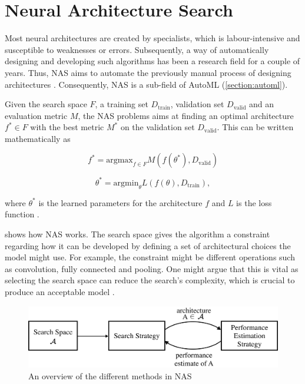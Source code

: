 \section{Neural Architecture Search} \label{section:nas}

Most neural architectures are created by specialists, which is labour-intensive and susceptible to weaknesses or errors. Subsequently, a way of automatically designing and developing such algorithms has been a research field for a couple of years. Thus, NAS aims to automate the previously manual process of designing architectures \autocite{elsken2019neural}. Consequently, NAS is a sub-field of AutoML (\cref{section:automl}). 

Given the search space $F$, a training set $D_{\text{train}}$, validation set $D_{\text{valid}}$ and an evaluation metric $M$, the NAS problems aims at finding an optimal architecture $f^* \in F$ with the best metric $M^*$ on the validation set $D_{\text{valid}}$. This can be written mathematically as 

\begin{equation*}
    f^* = \text{argmax}_{f \in F} M(f(\theta^*), D_{\text{valid}}) 
\end{equation*}

\begin{equation*}
    \theta^* = \text{argmin}_{\theta} L(f(\theta), D_{\text{train}}), 
\end{equation*}

where $\theta^*$ is the learned parameters for the architecture $f$ and $L$ is the loss function \autocite{zhou2019auto}. 




 shows how NAS works. The search space gives the algorithm a constraint regarding how it can be developed by defining a set of architectural choices the model might use. For example, the constraint might be different operations such as convolution, fully connected and pooling. One might argue that this is vital as selecting the search space can reduce the search's complexity, which is crucial to produce an acceptable model \autocite{kyriakides2020introduction}.

\begin{figure}[h]
    \centering
    \includegraphics[width=12cm]{figures/NAS_overview.png}
    \caption{An overview of the different methods in NAS \autocite{elsken2019neural} }
    \label{fig:nas_overview}
\end{figure}

